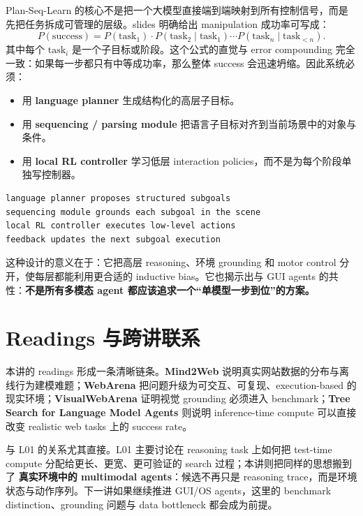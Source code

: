 \documentclass[a4paper]{article}
\begin{document}
Plan-Seq-Learn 的核心不是把一个大模型直接端到端映射到所有控制信号，而是先把任务拆成可管理的层级。slides 明确给出 manipulation 成功率可写成：
\[
P(\mathrm{success}) = P(\mathrm{task}_1) \cdot P(\mathrm{task}_2\mid \mathrm{task}_1) \cdots P(\mathrm{task}_n\mid \mathrm{task}_{<n}).
\]
其中每个 $\mathrm{task}_i$ 是一个子目标或阶段。这个公式的直觉与 error compounding 完全一致：如果每一步都只有中等成功率，那么整体 success 会迅速坍缩。因此系统必须：
\begin{itemize}
\item 用 \textbf{language planner} 生成结构化的高层子目标。
\item 用 \textbf{sequencing / parsing module} 把语言子目标对齐到当前场景中的对象与条件。
\item 用 \textbf{local RL controller} 学习低层 interaction policies，而不是为每个阶段单独写控制器。
\end{itemize}

\begin{lstlisting}
language planner proposes structured subgoals
sequencing module grounds each subgoal in the scene
local RL controller executes low-level actions
feedback updates the next subgoal execution
\end{lstlisting}

这种设计的意义在于：它把高层 reasoning、环境 grounding 和 motor control 分开，使每层都能利用更合适的 inductive bias。它也揭示出与 GUI agents 的共性：\textbf{不是所有多模态 agent 都应该追求一个“单模型一步到位”的方案。}

\section{Readings 与跨讲联系}

本讲的 readings 形成一条清晰链条。\textbf{Mind2Web} 说明真实网站数据的分布与离线行为建模难题；\textbf{WebArena} 把问题升级为可交互、可复现、execution-based 的现实环境；\textbf{VisualWebArena} 证明视觉 grounding 必须进入 benchmark；\textbf{Tree Search for Language Model Agents} 则说明 inference-time compute 可以直接改变 realistic web tasks 上的 success rate。

与 L01 的关系尤其直接。L01 主要讨论在 reasoning task 上如何把 test-time compute 分配给更长、更宽、更可验证的 search 过程；本讲则把同样的思想搬到了 \textbf{真实环境中的 multimodal agents}：候选不再只是 reasoning trace，而是环境状态与动作序列。下一讲如果继续推进 GUI/OS agents，这里的 benchmark distinction、grounding 问题与 data bottleneck 都会成为前提。
\end{document}
